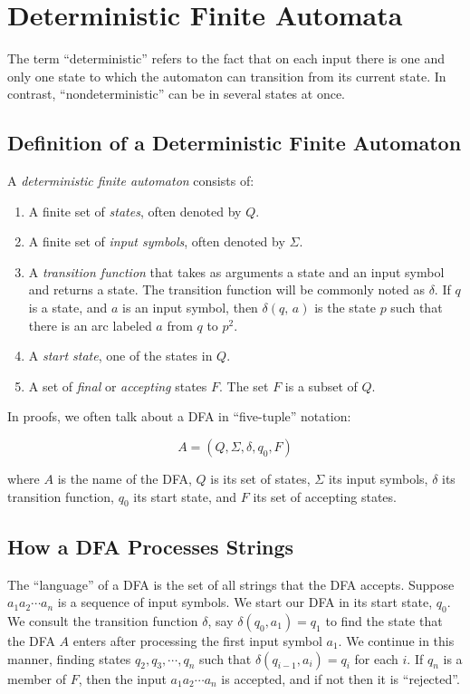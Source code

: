 \documentclass[]{article}
\begin{document}
\section*{Deterministic Finite Automata}
  The term ``deterministic'' refers to the fact that on each input there is
  one and only one state to which the automaton can transition from its
  current state. In contrast, ``nondeterministic'' can be in several states at
  once.

  \subsection*{Definition of a Deterministic Finite Automaton}
    A \emph{deterministic finite automaton} consists of:
    \begin{enumerate}
      \item A finite set of \emph{states}, often denoted by $Q$.
      \item A finite set of \emph{input symbols}, often denoted by $\Sigma$.
      \item A \emph{transition function} that takes as arguments a state and
      an input symbol and returns a state. The transition function will be
      commonly noted as $\delta$. If $q$ is a state, and $a$ is an input
      symbol, then $\delta(q, \, a)$ is the state $p$ such that there is an
      arc labeled $a$ from $q$ to $p^2$.
      \item A \emph{start state}, one of the states in $Q$.
      \item A set of \emph{final} or \emph{accepting} states $F$. The set $F$
      is a subset of $Q$.
    \end{enumerate}
    In proofs, we often talk about a DFA in ``five-tuple'' notation:

      \[ A = (Q, \Sigma, \delta, q_0, F) \]

    where $A$ is the name of the DFA, $Q$ is its set of states, $\Sigma$ its
    input symbols, $\delta$ its transition function, $q_0$ its start state,
    and $F$ its set of accepting states.

  \subsection*{How a DFA Processes Strings}
    The ``language'' of a DFA is the set of all strings that the DFA accepts.
    Suppose $a_{1}a_{2}\cdots a_n$ is a sequence of input symbols. We start
    our DFA in its start state, $q_0$. We consult the transition function
    $\delta$, say $\delta(q_0, a_1) = q_1$ to find the state that the DFA $A$
    enters after processing the first input symbol $a_1$. We continue in this
    manner, finding states $q_2,q_3,\cdots,q_n$ such that $\delta(q_{i-1},
    a_i) = q_i$ for each $i$. If $q_n$ is a member of $F$, then the input
    $a_{1}a_{2}\cdots a_n$ is accepted, and if not then it is ``rejected''.
\end{document}
